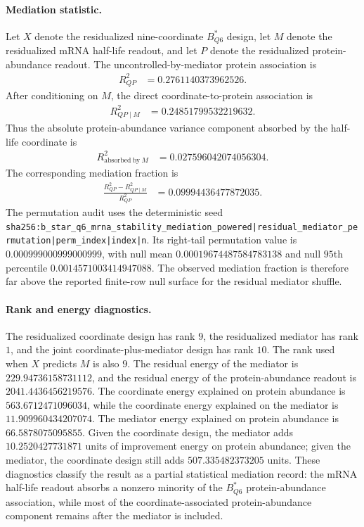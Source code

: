 \paragraph{Mediation statistic.}
Let $X$ denote the residualized nine-coordinate $B^{*}_{Q6}$ design, let $M$ denote the residualized mRNA half-life readout, and let $P$ denote the residualized protein-abundance readout. The uncontrolled-by-mediator protein association is
$$\begin{aligned}
R^{2}_{QP} &= 0.2761140373962526.
\end{aligned}$$
After conditioning on $M$, the direct coordinate-to-protein association is
$$\begin{aligned}
R^{2}_{QP\mid M} &= 0.24851799532219632.
\end{aligned}$$
Thus the absolute protein-abundance variance component absorbed by the half-life coordinate is
$$\begin{aligned}
R^{2}_{\mathrm{absorbed\ by\ }M} &= 0.027596042074056304.
\end{aligned}$$
The corresponding mediation fraction is
$$\begin{aligned}
\frac{R^{2}_{QP}-R^{2}_{QP\mid M}}{R^{2}_{QP}} &= 0.09994436477872035.
\end{aligned}$$
The permutation audit uses the deterministic seed \texttt{sha256:b\_star\_q6\_mrna\_stability\_mediation\_powered|residual\_mediator\_permutation|perm\_index|index|n}. Its right-tail permutation value is $0.000999000999000999$, with null mean $0.00019674487584783138$ and null $95$th percentile $0.0014571003414947088$. The observed mediation fraction is therefore far above the reported finite-row null surface for the residual mediator shuffle.

\paragraph{Rank and energy diagnostics.}
The residualized coordinate design has rank $9$, the residualized mediator has rank $1$, and the joint coordinate-plus-mediator design has rank $10$. The rank used when $X$ predicts $M$ is also $9$. The residual energy of the mediator is $229.94736158731112$, and the residual energy of the protein-abundance readout is $2041.4436456219576$. The coordinate energy explained on protein abundance is $563.6712471096034$, while the coordinate energy explained on the mediator is $11.909960434207074$. The mediator energy explained on protein abundance is $66.5878075095855$. Given the coordinate design, the mediator adds $10.2520427731871$ units of improvement energy on protein abundance; given the mediator, the coordinate design still adds $507.335482373205$ units. These diagnostics classify the result as a partial statistical mediation record: the mRNA half-life readout absorbs a nonzero minority of the $B^{*}_{Q6}$ protein-abundance association, while most of the coordinate-associated protein-abundance component remains after the mediator is included.

